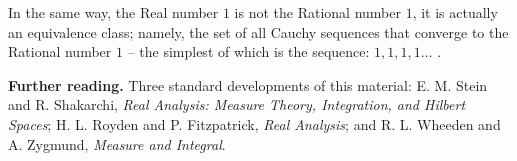 \documentclass{article}
\begin{document}
In the same way, the Real number $1$ is not the Rational number $1$, it is
actually an equivalence class; namely, the set of all Cauchy sequences that
converge to the Rational number $1$ -- the simplest of which is the
sequence: $1, 1, 1, 1\ldots$ .

\medskip
{\bf Further reading.} Three standard developments of this material:
E. M. Stein and R. Shakarchi, {\it Real Analysis: Measure Theory,
Integration, and Hilbert Spaces\/}; H. L. Royden and P. Fitzpatrick,
{\it Real Analysis\/}; and R. L. Wheeden and A. Zygmund,
{\it Measure and Integral\/}.
\end{document}
